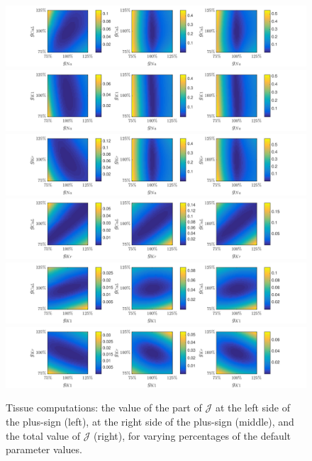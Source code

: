 \documentclass{article}
\begin{document}
%
\begin{figure}
\includegraphics[trim=0cm 0cm 0cm 0cm, clip=true, width=1\linewidth]{gcalgna} 
\includegraphics[trim=0cm 0cm 0cm 0cm, clip=true, width=1\linewidth]{gk1gna} 
\includegraphics[trim=0cm 0cm 0cm 0cm, clip=true, width=1\linewidth]{gkrgna} 
\includegraphics[trim=0cm 0cm 0cm 0cm, clip=true, width=1\linewidth]{gcalgkr} 
\includegraphics[scale = 1, trim=0cm 0cm 0cm 0cm, width=1\linewidth]{gcalgk1} 
\includegraphics[trim=0cm 0cm 0cm 0cm, clip=true, width=1\linewidth]{gkrgk1} 
    \caption{Tissue computations: the value of the part of $\mathcal{J}$ at the left side of the plus-sign (left), at the right side of the plus-sign (middle), and the total value of $\mathcal{J}$ (right), for varying percentages of the default parameter values.}
    \label{fig:11}
\end{figure}
%
\end{document}
